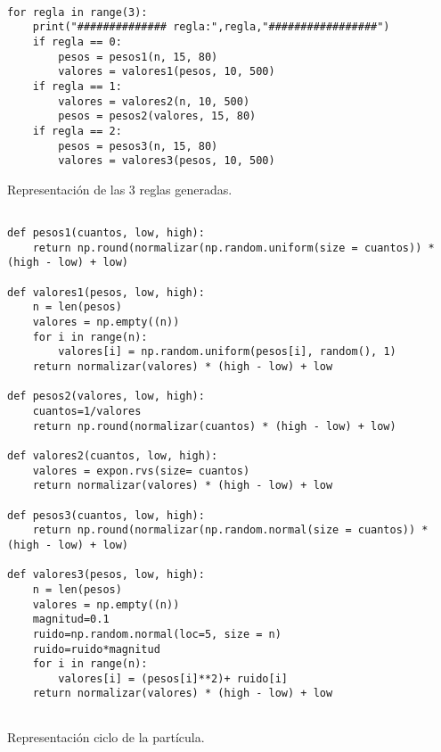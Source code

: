 \documentclass{article}
\begin{document}
\begin{listing}[H]
\begin{verbatim}

for regla in range(3):
    print("############## regla:",regla,"#################")
    if regla == 0:
        pesos = pesos1(n, 15, 80)
        valores = valores1(pesos, 10, 500)
    if regla == 1:
        valores = valores2(n, 10, 500)
        pesos = pesos2(valores, 15, 80)
    if regla == 2:
        pesos = pesos3(n, 15, 80)
        valores = valores3(pesos, 10, 500)

  \end{verbatim}
  \label{lst:fibo}
  \caption{Representación de las 3 reglas generadas.}
  
  
\end{listing}
\renewcommand{\listingscaption}{Código}
\begin{listing}[H]

\begin{verbatim}

def pesos1(cuantos, low, high):
    return np.round(normalizar(np.random.uniform(size = cuantos)) * (high - low) + low)
 
def valores1(pesos, low, high):
    n = len(pesos)
    valores = np.empty((n))
    for i in range(n):
        valores[i] = np.random.uniform(pesos[i], random(), 1)
    return normalizar(valores) * (high - low) + low

def pesos2(valores, low, high):
    cuantos=1/valores
    return np.round(normalizar(cuantos) * (high - low) + low)
 
def valores2(cuantos, low, high):
    valores = expon.rvs(size= cuantos)
    return normalizar(valores) * (high - low) + low

def pesos3(cuantos, low, high):
    return np.round(normalizar(np.random.normal(size = cuantos)) * (high - low) + low)
 
def valores3(pesos, low, high):
    n = len(pesos)
    valores = np.empty((n))
    magnitud=0.1
    ruido=np.random.normal(loc=5, size = n)
    ruido=ruido*magnitud
    for i in range(n):
        valores[i] = (pesos[i]**2)+ ruido[i]
    return normalizar(valores) * (high - low) + low
    
\end{verbatim}
\label{lst:fibo}
\caption{Representación ciclo de la partícula.}
\end{listing}
\end{document}

